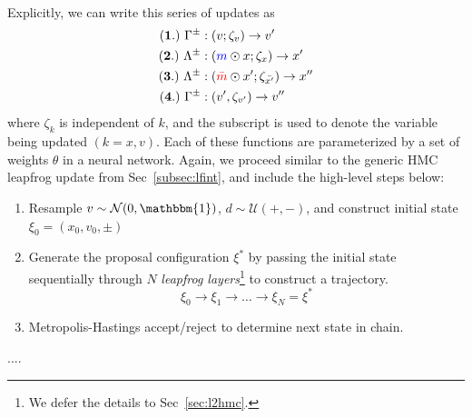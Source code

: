 \documentclass[a4paper,11pt]{article}
\newcommand{\mask}{\textcolor{blue}{m}}
\newcommand{\maskbar}{\textcolor{red}{\bar{m}}}
\begin{document}
Explicitly, we can write this series of updates as 
%
\begin{align}
    \mathbf{(1.)}\,\, \Gamma^{\pm} &: (v; \zeta_{v})  \rightarrow v' \\
    \mathbf{(2.)}\,\, \Lambda^{\pm} &: (\mask \odot x; \zeta_{x}) \rightarrow x' \\
    \mathbf{(3.)}\,\, \Lambda^{\pm} &: (\maskbar \odot x'; \zeta_{\bar{x'}}) \rightarrow x'' \\
    \mathbf{(4.)}\,\, \Gamma^{\pm} &: (v', \zeta_{v'})\rightarrow v''
\end{align}
%
where \(\zeta_{k}\) is independent of \(k\), and the subscript is used to
denote the variable being updated \((k = x, v)\).
%
Each of these functions are parameterized by a set of weights \(\theta\) in a
neural network.
%
Again, we proceed similar to the generic HMC leapfrog update from
Sec~\ref{subsec:lfint}, and include the high-level steps below:
%
\begin{enumerate}
    \item Resample \(v \sim \mathcal{N} (0, \mathbbm{1})\), \(d \sim
        \mathcal{U} (+, -)\), and construct initial state \(\xi_{0} = (x_{0},
        v_{0}, \pm)\)
    \item Generate the proposal configuration \(\xi^{\ast}\) by passing the
        initial state sequentially through \(N\) \emph{leapfrog
        layers}\footnote{
            We defer the details to Sec~\ref{sec:l2hmc}.
        } to construct a trajectory.
	    \begin{equation}
            \xi_{0} \rightarrow \xi_{1} \rightarrow \ldots \rightarrow%
            \xi_{N} = \xi^{\ast}
        \end{equation}
    \item Metropolis-Hastings accept/reject to determine next state in chain.
\end{enumerate}
%

%

%

\begin{thebibliography}{99}
....

\end{thebibliography}
\end{document}
